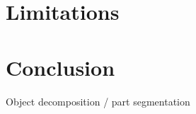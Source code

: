 \documentclass{article}
\newcommand{\ob}[1]{\textcolor{purple}{[\textbf{OB:} #1]}}
\begin{document}

\section{Limitations}


\section{Conclusion}

Object decomposition / part segmentation \cite{tenorth13decomposing,vahrenkamp16partbased,chen22neural}

\end{document}
